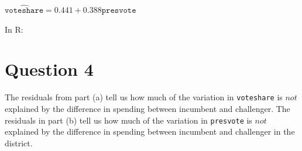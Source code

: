 \documentclass[12pt,letterpaper]{article}
\begin{document}
\begin{enumerate}
\begin{center}
		\vspace{.3cm}
		
		\(\widehat{\texttt{voteshare}} = 0.441 + 0.388\texttt{presvote} \)
			\end{center}
		\vspace{.25cm}
		
		In R:\\
		  
		
	\end{enumerate}
	

\newpage	
\section*{Question 4}
\noindent The residuals from part (a) tell us how much of the variation in \texttt{voteshare} is $not$ explained by the difference in spending between incumbent and challenger. The residuals in part (b) tell us how much of the variation in \texttt{presvote} is $not$ explained by the difference in spending between incumbent and challenger in the district.
\end{document}

